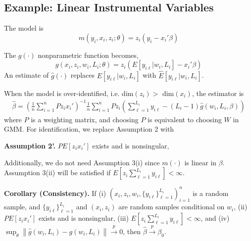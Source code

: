 \documentclass[12pt]{article}
\newcommand{\toP}{\overset{p}{\to}}
\newcommand{\meanN}{\frac{1}{n}\sum_{i=1}^n}
\begin{document}
\subsection*{Example: Linear Instrumental Variables} 
The model is \begin{equation} m(y_i, x_i, z_i; \theta) = z_i(y_i-x_i'\beta) \end{equation}

The $g(\cdot)$ nonparametric function becomes, 
$$ g(x_i, z_i, w_i, L_i;\theta) = z_i\left(E[y_{i\ell} | w_i, L_i] - x_i'\beta\right)$$
An estimate of $\hat{g}(\cdot)$ replaces $E[y_{i\ell} | w_i, L_i]$ with $\hat{E}[y_{i\ell} | w_i, L_i]$.  




When the model is over-identified, i.e. dim$(z_i) > $ dim$(x_i)$, the estimator is 
\begin{gather*}
    \hat{\beta} = \left( \meanN P z_ix_i' \right)^{-1} \meanN Pz_i\left(\sum_{\ell = 1}^{L_i} y_{i\ell} - (L_i - 1) \hat{g}(w_i,L_i,\beta) \right)
\end{gather*}
where $P$ is a weighting matrix, and choosing $P$ is equivalent to choosing $W$ in GMM. 
For identification, we replace Assumption 2 with 

\textbf{Assumption 2'.}  $PE[z_ix_i']$ exists and is nonsingular,

 Additionally, we do not need Assumption 3(i) since $m(\cdot)$ is linear in $\beta$.  Assumption 3(ii) will be satisfied if  $E[z_i\sum_{\ell=1}^{L_i}y_{i\ell}]<\infty$.  

\textbf{Corollary (Consistency).}  If (i) $(x_i,z_i, w_i, \{y_{i\ell}\}_{\ell=1}^{L_i})_{i=1}^n$ is a random sample, and $\{y_{i\ell}\}_{\ell=1}^{L_i}$ and $(x_i,z_i)$ are random samples conditional on $w_i$, (ii) $PE[z_ix_i']$ exists and is nonsingular, (iii) $E[z_i\sum_{\ell=1}^{L_i}y_{i\ell}]<\infty$, and (iv) $\sup_{\theta} \left\lVert \hat{g}(w_i, L_i) - g(w_i, L_i) \right\rVert \toP 0$, then $\hat{\beta}\toP \beta_0$. 
\end{document}
